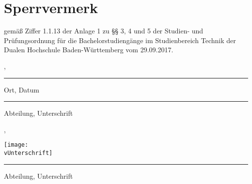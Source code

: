 \thispagestyle{empty}
\section*{\Huge{Sperrvermerk}}

gemäß Ziffer 1.1.13 der Anlage 1 zu §§ 3, 4 und 5 der Studien- und Prüfungsordnung für die Bachelorstudiengänge im Studienbereich Technik der Dualen Hochschule Baden-Würt­tem­berg vom 29.09.2017.\\

\noindent {}

\vfill
\leavevmode
\newline
\parbox{6cm}{\strut\centering \vBearbeitungsort, \vAbgabedatum\hrule\strut\centering\footnotesize Ort, Datum} 
\hfill
\ifx\vUnterschrift\empty
\parbox{6cm}{\strut\hspace{1pt} \vAbteilung\hrule\strut\centering\footnotesize Abteilung, Unterschrift}
\else
\parbox{6cm}{\strut\hspace{1pt} \vAbteilung, \parbox[b]{3cm}{\vspace{-10cm}\texttt{[image: \\vUnterschrift]}}\hrule\strut\centering\footnotesize Abteilung, Unterschrift}
\fi
\vspace{1cm}

\newpage